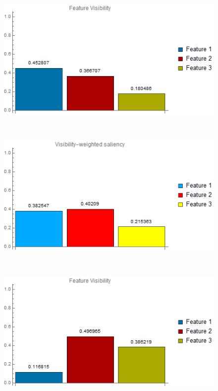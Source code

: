 \begin{figure}
	\begin{minipage}{.24\textwidth}
		\includegraphics[width=1\linewidth]{images/tooth_naive_visibility_chart}
		\subcaption{}
	\end{minipage}~
	\begin{minipage}{.24\textwidth}
		\includegraphics[width=1\linewidth]{images/tooth_naive_visibility_saliency_weighted_chart}
		\subcaption{}
	\end{minipage}~
	\begin{minipage}{.24\textwidth}
		\includegraphics[width=1\linewidth]{images/tooth_naive_optimized_linesearch_visibility_chart}

\end{minipage}
\end{figure}
